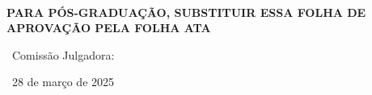 %
\begin{folhadeaprovacao}
  \begin{center}
       {\ABNTEXchapterfont\normalfont\imprimirautor}\\
\textbf{PARA PÓS-GRADUAÇÃO, SUBSTITUIR ESSA FOLHA DE APROVAÇÃO PELA FOLHA ATA}
	 \vspace*{2cm}
   
    \begin{center}
      \ABNTEXchapterfont\bfseries\MakeUppercase\imprimirtitulo

    \end{center}
		\vspace*{3cm}
		\hspace{.45\textwidth}
    \begin{minipage}{.5\textwidth}
        \imprimirpreambulo
    \end{minipage}
		\vspace*{2cm}
	\end{center}

  \begin{center}
		
	  {\ABNTEXchapterfont\normalfont\ {Comiss\~ao Julgadora:} \\}
		

		
		
		\vspace*{4cm}
   	{\ABNTEXchapterfont\normalfont\imprimirlocal}
    \par
  {\ABNTEXchapterfont\normalfont\ {28 de mar\c{c}o de 2025} \\}
\end{center}
\end{folhadeaprovacao}
